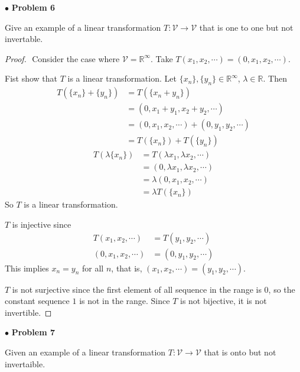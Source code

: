 \documentclass{article}
\begin{document}
\newpage
$ \bullet$ \textbf{Problem 6}
\medskip

\begin{itshape}
Give an example of a linear transformation $T: \mathcal{V} \to \mathcal{V}$ that is one to one but not invertable.
\end{itshape}
\medskip

\begin{proof}
$ $\newline
Consider the case where $\mathcal{V} = \mathbb{R}^\infty$. Take $T(x_1, x_2, \cdots) = (0, x_1, x_2, \cdots)$. 
\medskip

Fist show that $T$ is a linear transformation.
Let $\{x_n\}, \{y_n \} \in \mathbb{R}^\infty$, $\lambda \in \mathbb{R}$. Then
\begin{align*}
T(\{x_n\} + \{y_n \} ) &= T( \{x_n +y_n \}) \\
&= (0, x_1+y_1, x_2+y_2, \cdots) \\
&= (0, x_1, x_2, \cdots) + (0, y_1, y_2, \cdots) \\
&= T(\{x_n\}) + T(\{y_n \})
\end{align*}
\begin{align*}
T(\lambda\{x_n\}) &= T(\lambda x_1, \lambda x_2, \cdots) \\
&= (0, \lambda x_1, \lambda x_2, \cdots) \\
&= \lambda (0, x_1, x_2, \cdots) \\
&= \lambda T(\{x_n\})
\end{align*}
So $T$ is a linear transformation.
\medskip

$T$ is injective since 
\begin{align*}
T(x_1, x_2, \cdots) &= T(y_1, y_2, \cdots) \\
(0, x_1, x_2, \cdots) &= (0, y_1, y_2, \cdots) 
\end{align*}
This implies $x_n= y_n$ for all $n$, that is, $(x_1, x_2, \cdots) = (y_1, y_2, \cdots)$.
\medskip

$T$ is not surjective since the first element of all sequence in the range is $0$, so the constant sequence $1$ is not in the range. Since $T$ is not bijective, it is not invertible.
\end{proof}

\newpage
$ \bullet$ \textbf{Problem 7}
\medskip

\begin{itshape}
Given an example of a linear transformation $T: \mathcal{V} \to \mathcal{V}$ that is onto but not invertaible.
\end{itshape}
\medskip
\end{document}
